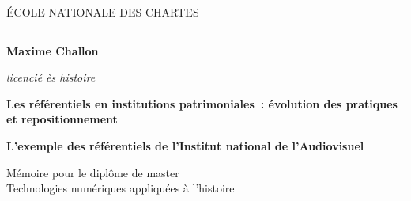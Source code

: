 \begin{titlepage}
		\begin{center}
			
			\bigskip
			
			\begin{large}
				\'ECOLE NATIONALE DES CHARTES
			\end{large}
			\begin{center}\rule{2cm}{0.02cm}\end{center}
			
			\bigskip
			\bigskip
			\bigskip
			\begin{Large}
				\textbf{Maxime Challon}\\
			\end{Large}
			\begin{normalsize} \textit{licencié ès histoire}
			\end{normalsize}
			
			\bigskip
			\bigskip
			\bigskip
			
			\begin{Huge}
				\textbf{Les référentiels en institutions patrimoniales : évolution des pratiques et repositionnement}\\
			\end{Huge}
			\bigskip
			\bigskip
			\begin{LARGE}
				\textbf{L’exemple des référentiels de l’Institut national de l’Audiovisuel}\\
			\end{LARGE}
			
			\bigskip
			\bigskip
			\bigskip
			\begin{large}
			\end{large}
			\vfill
			
			\begin{large}
				Mémoire 
				pour le diplôme de master \\
				\og{} Technologies numériques appliquées à l'histoire \fg{} \\
			\end{large}
			
		\end{center}
	\end{titlepage}

\thispagestyle{empty}	
\cleardoublepage